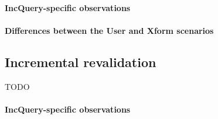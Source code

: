 \paragraph{IncQuery-specific observations}

% 



\paragraph{Differences between the User and Xform scenarios}



\subsection{Incremental revalidation}
TODO

% 

\paragraph{IncQuery-specific observations}

